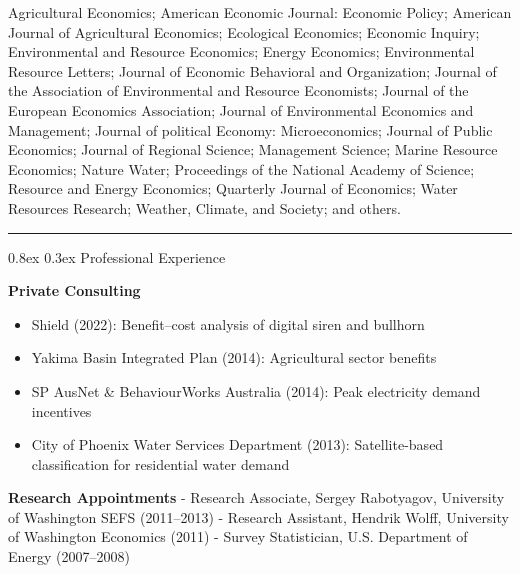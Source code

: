 \documentclass[
  11pt,
]{article}
\makeatletter
\providecommand{\tightlist}{%
  \setlength{\itemsep}{0pt}\setlength{\parskip}{0pt}}
\renewcommand\subsection{
  \@startsection{subsection}{2}{0pt}
  {0.8ex}
  {0.3ex}
  {\sffamily\bfseries\large}
}
\makeatother
\begin{document}
Agricultural Economics; American Economic Journal: Economic Policy;
American Journal of Agricultural Economics; Ecological Economics;
Economic Inquiry; Environmental and Resource Economics; Energy
Economics; Environmental Resource Letters; Journal of Economic
Behavioral and Organization; Journal of the Association of Environmental
and Resource Economists; Journal of the European Economics Association;
Journal of Environmental Economics and Management; Journal of political
Economy: Microeconomics; Journal of Public Economics; Journal of
Regional Science; Management Science; Marine Resource Economics; Nature
Water; Proceedings of the National Academy of Science; Resource and
Energy Economics; Quarterly Journal of Economics; Water Resources
Research; Weather, Climate, and Society; and others.

\begin{center}\rule{0.5\linewidth}{0.5pt}\end{center}

\subsection{Professional Experience}\label{professional-experience}

\textbf{Private Consulting}

\begin{itemize}
\tightlist
\item
  Shield (2022): Benefit--cost analysis of digital siren and bullhorn
\item
  Yakima Basin Integrated Plan (2014): Agricultural sector benefits
\item
  SP AusNet \& BehaviourWorks Australia (2014): Peak electricity demand
  incentives
\item
  City of Phoenix Water Services Department (2013): Satellite-based
  classification for residential water demand
\end{itemize}

\textbf{Research Appointments} - Research Associate, Sergey Rabotyagov,
University of Washington SEFS (2011--2013) - Research Assistant, Hendrik
Wolff, University of Washington Economics (2011) - Survey Statistician,
U.S. Department of Energy (2007--2008)
\end{document}

